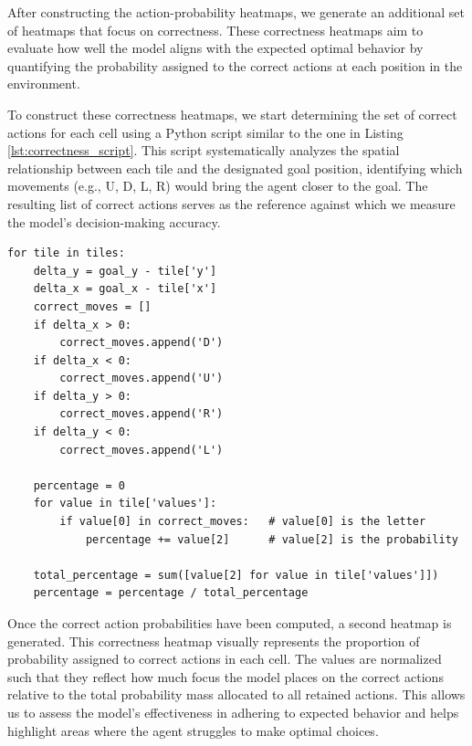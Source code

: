 After constructing the action-probability heatmaps, we generate an additional set
of heatmaps that focus on correctness. These correctness heatmaps aim to
evaluate how well the model aligns with the expected optimal behavior by
quantifying the probability assigned to the correct actions at each position in
the environment.

To construct these correctness heatmaps, we start determining the set of correct
actions for each cell using a Python script similar to the one in Listing \ref{lst:correctness_script}.
This script systematically analyzes the spatial relationship between each tile
and the designated goal position, identifying which movements (e.g., U, D, L, R)
would bring the agent closer to the goal. The resulting list of correct actions serves
as the reference against which we measure the model's decision-making accuracy.

\vspace{5mm}
\begin{codewindow}
    \begin{lstlisting}
for tile in tiles:
    delta_y = goal_y - tile['y']
    delta_x = goal_x - tile['x']
    correct_moves = []
    if delta_x > 0:
        correct_moves.append('D')
    if delta_x < 0:
        correct_moves.append('U')
    if delta_y > 0:
        correct_moves.append('R')
    if delta_y < 0:
        correct_moves.append('L')

    percentage = 0
    for value in tile['values']:
        if value[0] in correct_moves:   # value[0] is the letter
            percentage += value[2]      # value[2] is the probability

    total_percentage = sum([value[2] for value in tile['values']])
    percentage = percentage / total_percentage
\end{lstlisting}
\end{codewindow}
\vspace{5mm}

Once the correct action probabilities have been computed, a second heatmap is generated.
This correctness heatmap visually represents the proportion of probability
assigned to correct actions in each cell. The values are normalized such that they
reflect how much focus the model places on the correct actions relative to the total
probability mass allocated to all retained actions. This allows us to assess the
model's effectiveness in adhering to expected behavior and helps highlight areas
where the agent struggles to make optimal choices.

